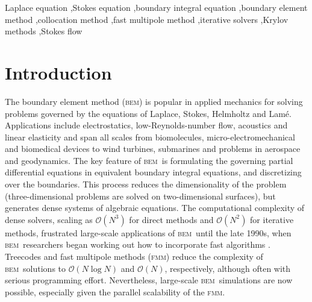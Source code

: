 \documentclass[final,3p,times]{elsarticle}
\newcommand{\bem}{\textsc{bem}\xspace}
\newcommand{\fmm}{\textsc{fmm}\xspace}
\renewcommand{\O}[1]{\mathcal{O}(#1)}
\begin{document}
\begin{frontmatter}
\begin{keyword}
Laplace equation \sep Stokes equation \sep boundary integral equation \sep boundary element method \sep collocation method \sep fast multipole method \sep iterative solvers \sep Krylov methods \sep Stokes flow

\end{keyword}

\end{frontmatter}




\section{Introduction}

The boundary element method (\bem) is popular in applied mechanics for solving problems governed by the equations of Laplace, Stokes, Helmholtz and Lam{\'e}. Applications include electrostatics, low-Reynolds-number flow, acoustics and linear elasticity and span all scales from biomolecules, micro-electromechanical and biomedical devices to wind turbines, submarines and  problems in aerospace and geodynamics. The key feature of \bem\ is formulating the governing partial differential equations in equivalent boundary integral equations, and discretizing over the boundaries. This process reduces the dimensionality of the problem (three-dimensional problems are solved on two-dimensional surfaces), but generates dense systems of algebraic equations. 
The computational complexity of dense solvers, scaling as $\O{N^3}$ for direct methods and $\O{N^2}$ for iterative methods, frustrated large-scale applications of \bem\ until the late 1990s, when \bem\ researchers began working out how to incorporate fast algorithms 
\cite{Liu2006}. Treecodes and fast multipole methods (\fmm) reduce the complexity of \bem\ solutions to $\O{N \log N}$ and $\O{N}$, respectively, although often with serious programming effort. Nevertheless, large-scale \bem\ simulations are now possible, especially given the parallel scalability of the \fmm \cite{YokotaETal2011a,YokotaBarba2011a}.
\end{document}
